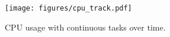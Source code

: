 

\begin{figure}[t]
    \centering
    \texttt{[image: figures/cpu\_track.pdf]}
    \caption{CPU usage with continuous tasks over time.}
    \label{fig:CPU_track}
\end{figure}






